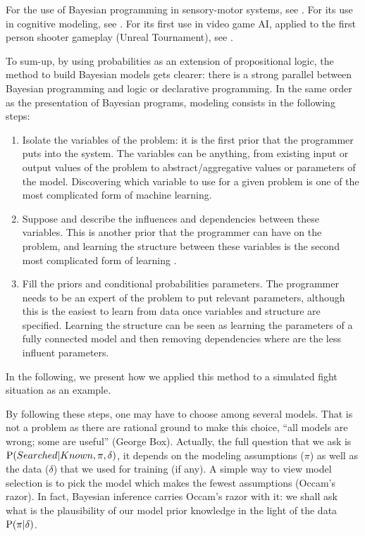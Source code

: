 For the use of Bayesian programming in sensory-motor systems, see \citep{PRDMSMS}. For its use in cognitive modeling, see \citep{Colas10}. For its first use in video game AI, applied to the first person shooter gameplay (Unreal Tournament), see \citep{LeHy04}.

To sum-up, by using probabilities as an extension of propositional logic, the method %
to build Bayesian models gets clearer: there is a strong parallel between Bayesian programming and logic or declarative programming. In the same order as the presentation of Bayesian programs, modeling consists in the following steps:
\begin{enumerate}
    \item Isolate the variables of the problem: it is the first prior that the programmer puts into the system. The variables can be anything, from existing input or output values of the problem to abstract/aggregative values or parameters of the model. Discovering which variable to use for a given problem is one of the most complicated form of machine learning.
    \item Suppose and describe the influences and dependencies between these variables. This is another prior that the programmer can have on the problem, and learning the structure between these variables is the second most complicated form of learning \citep{Fra04b,Ler05a}.
    \item Fill the priors and conditional probabilities parameters. The programmer needs to be an expert of the problem to put relevant parameters, although this is the easiest to learn from data once variables and structure are specified. Learning the structure can be seen as learning the parameters of a fully connected model and then removing dependencies where are the less influent parameters.%
\end{enumerate}
In the following, we present how we applied this method to a simulated  fight situation as an example.

By following these steps, one may have to choose among several models. That is not a problem as there are rational ground to make this choice, ``all models are wrong; some are useful'' (George Box). %
Actually, the full question that we ask is $\mathrm{P}(Searched|Known, \pi, \delta)$, it depends on the modeling assumptions ($\pi$) as well as the data ($\delta$) that we used for training (if any). A simple way to view model selection is to pick the model which makes the fewest assumptions (Occam's razor). In fact, Bayesian inference carries Occam's razor with it: we shall ask what is the plausibility of our model prior knowledge in the light of the data $\mathrm{P}(\pi|\delta)$. 

